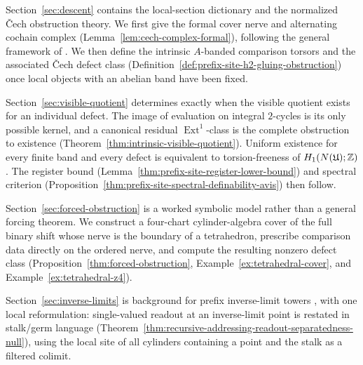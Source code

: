 Section~\ref{sec:descent} contains the local-section dictionary and the
normalized \v{C}ech obstruction theory.  We first give the formal cover nerve
and alternating cochain complex
(Lemma~\ref{lem:cech-complex-formal}), following the general framework of
\cite{StacksProject,Giraud1971CohomologieNonAbelienne,Bredon1997SheafTheory,HatcherAlgebraicTopology}.
We then define the intrinsic $A$-banded comparison torsors and the associated
\v{C}ech defect class
(Definition~\ref{def:prefix-site-h2-gluing-obstruction}) once local objects
with an abelian band have been fixed.

Section~\ref{sec:visible-quotient} determines exactly when the visible quotient
exists for an individual defect.  The image of evaluation on integral
$2$-cycles is its only possible kernel, and a canonical residual
$\operatorname{Ext}^1$-class is the complete obstruction to existence
(Theorem~\ref{thm:intrinsic-visible-quotient}).  Uniform existence for every
finite band and every defect is equivalent to torsion-freeness of
$H_1(N(\mathfrak{U});\mathbb{Z})$.  The register bound
(Lemma~\ref{thm:prefix-site-register-lower-bound}) and spectral criterion
(Proposition~\ref{thm:prefix-site-spectral-definability-avis}) then follow.

Section~\ref{sec:forced-obstruction} is a worked symbolic model rather than a
general forcing theorem.  We construct a four-chart cylinder-algebra cover of the full
binary shift whose nerve is the boundary of a tetrahedron, prescribe
comparison data directly on the ordered nerve, and compute the resulting
nonzero defect class (Proposition~\ref{thm:forced-obstruction},
Example~\ref{ex:tetrahedral-cover}, and
Example~\ref{ex:tetrahedral-z4}).

Section~\ref{sec:inverse-limits} is background for prefix inverse-limit towers
\cite{RibesZalesskii2010ProfiniteGroups,LindMarcus1995SymbolicDynamics,Kitchens1998SymbolicDynamics},
with one local reformulation: single-valued readout at an inverse-limit point
is restated in stalk/germ language
(Theorem~\ref{thm:recursive-addressing-readout-separatedness-null}), using the
local site of all cylinders containing a point and the stalk as a filtered
colimit.

